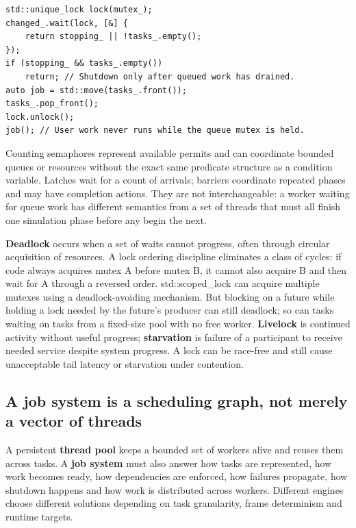 \begin{verbatim}
std::unique_lock lock(mutex_);
changed_.wait(lock, [&] {
    return stopping_ || !tasks_.empty();
});
if (stopping_ && tasks_.empty())
    return; // Shutdown only after queued work has drained.
auto job = std::move(tasks_.front());
tasks_.pop_front();
lock.unlock();
job(); // User work never runs while the queue mutex is held.
\end{verbatim}

Counting semaphores represent available permits and can coordinate bounded queues or resources without the exact same predicate structure as a condition variable. Latches wait for a count of arrivals; barriers coordinate repeated phases and may have completion actions. They are not interchangeable: a worker waiting for queue work has different semantics from a set of threads that must all finish one simulation phase before any begin the next.

\textbf{Deadlock} occurs when a set of waits cannot progress, often through circular acquisition of resources. A lock ordering discipline eliminates a class of cycles: if code always acquires mutex A before mutex B, it cannot also acquire B and then wait for A through a reversed order. std::scoped\_lock can acquire multiple mutexes using a deadlock-avoiding mechanism. But blocking on a future while holding a lock needed by the future's producer can still deadlock; so can tasks waiting on tasks from a fixed-size pool with no free worker. \textbf{Livelock} is continued activity without useful progress; \textbf{starvation} is failure of a participant to receive needed service despite system progress. A lock can be race-free and still cause unacceptable tail latency or starvation under contention.

\subsection{A job system is a scheduling graph, not merely a vector of threads}\label{05-engine-i-ch007-a-job-system-is-a-scheduling-graph-not-merely-a-vector-of-threads}

A persistent \textbf{thread pool} keeps a bounded set of workers alive and reuses them across tasks. A \textbf{job system} must also answer how tasks are represented, how work becomes ready, how dependencies are enforced, how failures propagate, how shutdown happens and how work is distributed across workers. Different engines choose different solutions depending on task granularity, frame determinism and runtime targets.

